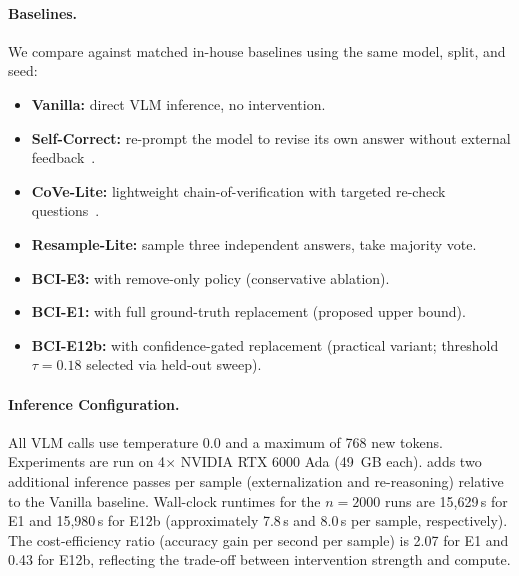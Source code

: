 \paragraph{Baselines.}
We compare against matched in-house baselines using the same model, split, and seed:
\begin{itemize}[leftmargin=1.5em,itemsep=1pt,topsep=2pt]
  \item \textbf{Vanilla:} direct VLM inference, no intervention.
  \item \textbf{Self-Correct:} re-prompt the model to revise its own answer without
    external feedback~\cite{madaan2023self}.
  \item \textbf{CoVe-Lite:} lightweight chain-of-verification with targeted re-check
    questions~\cite{dhuliawala2024chain}.
  \item \textbf{Resample-Lite:} sample three independent answers, take majority vote.
  \item \textbf{BCI-E3:} \bci{} with remove-only policy (conservative ablation).
  \item \textbf{BCI-E1:} \bci{} with full ground-truth replacement (proposed upper
    bound).
  \item \textbf{BCI-E12b:} \bci{} with confidence-gated replacement
    (practical variant; threshold $\tau{=}0.18$ selected via held-out sweep).
\end{itemize}

\paragraph{Inference Configuration.}
All VLM calls use temperature 0.0 and a maximum of 768 new tokens.
Experiments are run on 4$\times$ NVIDIA RTX 6000 Ada (49~GB each).
\bci{} adds two additional inference passes per sample (externalization and
re-reasoning) relative to the Vanilla baseline.
Wall-clock runtimes for the $n{=}2000$ runs are 15{,}629\,s for E1 and
15{,}980\,s for E12b (approximately 7.8\,s and 8.0\,s per sample, respectively).
The cost-efficiency ratio (accuracy gain per second per sample) is 2.07 for E1
and 0.43 for E12b, reflecting the trade-off between intervention strength and compute.
